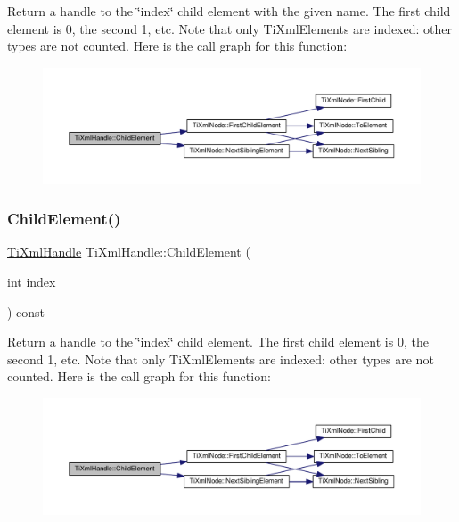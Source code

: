 Return a handle to the \char`\"{}index\char`\"{} child element with the given name. The first child element is 0, the second 1, etc. Note that only Ti\+Xml\+Elements are indexed\+: other types are not counted. Here is the call graph for this function\+:\nopagebreak
\begin{figure}[H]
\begin{center}
\leavevmode
\includegraphics[width=350pt]{class_ti_xml_handle_afccc59d8a0daa8c5d78474fbed430ddb_cgraph}
\end{center}
\end{figure}
\mbox{\label{class_ti_xml_handle_a57a639ab0ac99ff9358f675a1b73049a}} 
\subsubsection{\texorpdfstring{Child\+Element()}{ChildElement()}\hspace{0.1cm}{\footnotesize\ttfamily [2/2]}}
{\footnotesize\ttfamily \hyperlink{class_ti_xml_handle}{Ti\+Xml\+Handle} Ti\+Xml\+Handle\+::\+Child\+Element (\begin{DoxyParamCaption}\item[{int}]{index }\end{DoxyParamCaption}) const}

Return a handle to the \char`\"{}index\char`\"{} child element. The first child element is 0, the second 1, etc. Note that only Ti\+Xml\+Elements are indexed\+: other types are not counted. Here is the call graph for this function\+:\nopagebreak
\begin{figure}[H]
\begin{center}
\leavevmode
\includegraphics[width=350pt]{class_ti_xml_handle_a57a639ab0ac99ff9358f675a1b73049a_cgraph}
\end{center}
\end{figure}
\mbox{\label{class_ti_xml_handle_ae9b22d71bf5f69ee5fda28f5ad21f19c}} 
